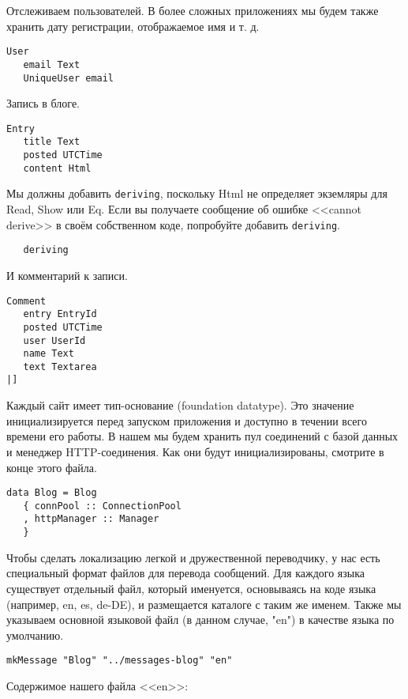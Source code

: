 Отслеживаем пользователей. В более сложных приложениях мы будем также хранить дату регистрации, отображаемое имя и т. д.
 
\begin{lstlisting}
User
   email Text
   UniqueUser email
\end{lstlisting}
 
Запись в блоге. 
 
\begin{lstlisting}
Entry
   title Text
   posted UTCTime
   content Html
\end{lstlisting}
 
Мы должны добавить \lstinline!deriving!, поскольку Html не определяет экземляры для Read, Show или Eq. Если вы получаете сообщение об ошибке <<cannot derive>> в своём собственном коде, попробуйте добавить \lstinline!deriving!.
 
\begin{lstlisting}
   deriving
\end{lstlisting}
 
И комментарий к записи.
 
\begin{lstlisting}
Comment
   entry EntryId
   posted UTCTime
   user UserId
   name Text
   text Textarea
|]
\end{lstlisting}
 
Каждый сайт имеет тип-основание (foundation datatype). Это значение инициализируется перед запуском приложения и доступно в течении всего времени его работы. В нашем мы будем хранить пул соединений с базой данных и менеджер HTTP-соединения. Как они будут инициализированы, смотрите в конце этого файла.
 
\begin{lstlisting}
data Blog = Blog
   { connPool :: ConnectionPool
   , httpManager :: Manager
   }
\end{lstlisting}
 
Чтобы сделать локализацию легкой и дружественной переводчику, у нас есть специальный формат файлов для перевода сообщений. Для каждого языка существует отдельный файл, который именуется, основываясь на коде языка (например, en, es, de-DE), и размещается каталоге с таким же именем. Также мы указываем основной языковой файл (в данном случае, "en") в качестве языка по умолчанию.
 
\begin{lstlisting}
mkMessage "Blog" "../messages-blog" "en"
\end{lstlisting}
 
Содержимое нашего файла <<en>>: 

